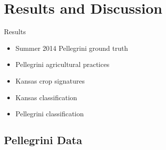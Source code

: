\documentclass[draft,compress]{beamer}
\begin{document}
\section{Results and Discussion}
\begin{frame}{Results}
\begin{itemize}
  \item Summer 2014 Pellegrini ground truth
  \item Pellegrini agricultural practices
  \item Kansas crop signatures
  \item Kansas classification
  \item Pellegrini classification
\end{itemize}
\end{frame}

\subsection{Pellegrini Data}
\end{document}
